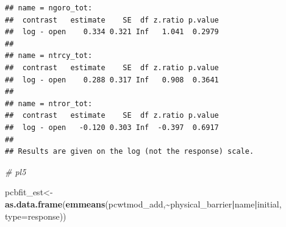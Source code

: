 \documentclass[
]{article}
\newenvironment{Shaded}{\begin{snugshade}}{\end{snugshade}}
\newcommand{\AttributeTok}[1]{\textcolor[rgb]{0.13,0.29,0.53}{#1}}
\newcommand{\CommentTok}[1]{\textcolor[rgb]{0.56,0.35,0.01}{\textit{#1}}}
\newcommand{\FunctionTok}[1]{\textcolor[rgb]{0.13,0.29,0.53}{\textbf{#1}}}
\newcommand{\NormalTok}[1]{#1}
\newcommand{\OtherTok}[1]{\textcolor[rgb]{0.56,0.35,0.01}{#1}}
\newcommand{\SpecialCharTok}[1]{\textcolor[rgb]{0.81,0.36,0.00}{\textbf{#1}}}
\newcommand{\StringTok}[1]{\textcolor[rgb]{0.31,0.60,0.02}{#1}}
\begin{document}
\begin{verbatim}
## name = ngoro_tot:
##  contrast   estimate    SE  df z.ratio p.value
##  log - open    0.334 0.321 Inf   1.041  0.2979
## 
## name = ntrcy_tot:
##  contrast   estimate    SE  df z.ratio p.value
##  log - open    0.288 0.317 Inf   0.908  0.3641
## 
## name = ntror_tot:
##  contrast   estimate    SE  df z.ratio p.value
##  log - open   -0.120 0.303 Inf  -0.397  0.6917
## 
## Results are given on the log (not the response) scale.
\end{verbatim}

\begin{Shaded}
\begin{Highlighting}[]
\CommentTok{\# pl5}

\NormalTok{pcbfit\_est}\OtherTok{\textless{}{-}}\FunctionTok{as.data.frame}\NormalTok{(}\FunctionTok{emmeans}\NormalTok{(pcwtmod\_add,}\SpecialCharTok{\textasciitilde{}}\NormalTok{physical\_barrier}\SpecialCharTok{|}\NormalTok{name}\SpecialCharTok{|}\NormalTok{initial, }\AttributeTok{type=}\StringTok{\textquotesingle{}response\textquotesingle{}}\NormalTok{))}



\end{Highlighting}
\end{Shaded}
\end{document}
